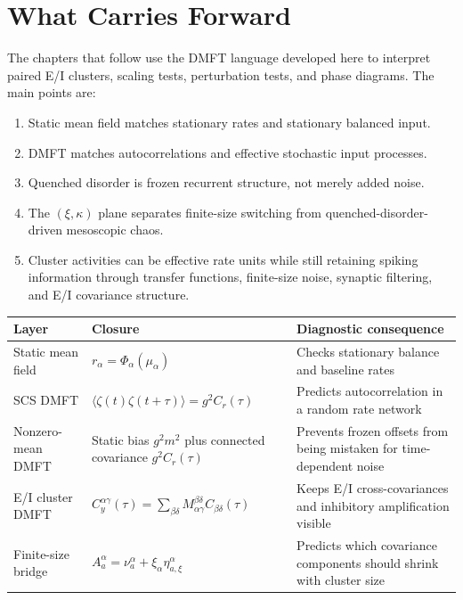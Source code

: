 \section{What Carries Forward}
\label{sec:ch07-carries-forward}

The chapters that follow use the DMFT language developed here to interpret
paired E/I clusters, scaling tests, perturbation tests, and phase diagrams. The
main points are:

\begin{enumerate}
    \item Static mean field matches stationary rates and stationary balanced
    input.
    \item DMFT matches autocorrelations and effective stochastic input
    processes.
    \item Quenched disorder is frozen recurrent structure, not merely added
    noise.
    \item The \((\xi,\kappa)\) plane separates finite-size switching from
    quenched-disorder-driven mesoscopic chaos.
    \item Cluster activities can be effective rate units while still retaining
    spiking information through transfer functions, finite-size noise, synaptic
    filtering, and E/I covariance structure.
\end{enumerate}

\begin{chaptersummary}
\begin{center}
\renewcommand{\arraystretch}{1.35}
\begin{tabularx}{\textwidth}{@{}l X X@{}}
  \toprule
  \textbf{Layer} & \textbf{Closure} & \textbf{Diagnostic consequence} \\
  \midrule
  Static mean field &
  \(r_\alpha=\Phi_\alpha(\mu_\alpha)\) &
  Checks stationary balance and baseline rates \\
  SCS DMFT &
  \(\langle\zeta(t)\zeta(t+\tau)\rangle=g^2C_r(\tau)\) &
  Predicts autocorrelation in a random rate network \\
  Nonzero-mean DMFT &
  Static bias \(g^2m^2\) plus connected covariance \(g^2C_r(\tau)\) &
  Prevents frozen offsets from being mistaken for time-dependent noise \\
  E/I cluster DMFT &
  \(C_y^{\alpha\gamma}(\tau)=
  \sum_{\beta\delta}M_{\alpha\gamma}^{\beta\delta}
  C_{\beta\delta}(\tau)\) &
  Keeps E/I cross-covariances and inhibitory amplification visible \\
  Finite-size bridge &
  \(A_a^\alpha=\nu_a^\alpha+\xi_\alpha\eta_{a,\xi}^\alpha\) &
  Predicts which covariance components should shrink with cluster size \\
  \bottomrule
\end{tabularx}
\end{center}
\end{chaptersummary}

